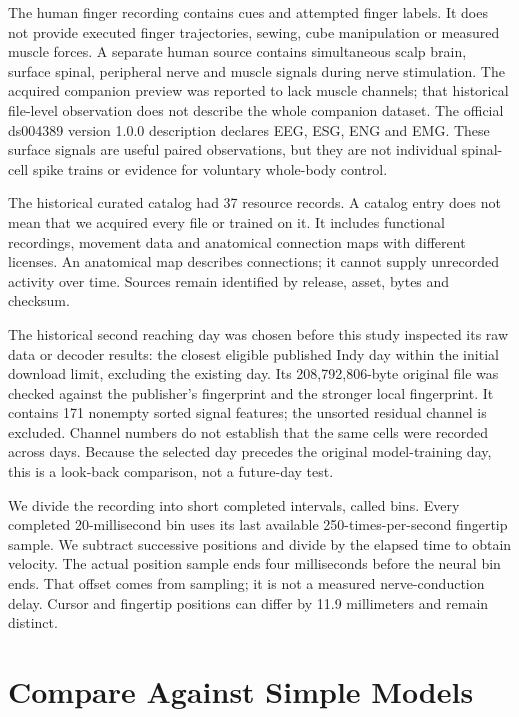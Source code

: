 The human finger recording contains cues and attempted finger labels. It does
not provide executed finger trajectories, sewing, cube manipulation or measured
muscle forces. A separate human source contains simultaneous scalp brain,
surface spinal, peripheral nerve and muscle signals during nerve stimulation.
The acquired companion preview was reported to lack muscle channels; that historical file-level observation does not describe the whole companion dataset. The official ds004389 version 1.0.0 description declares EEG, ESG, ENG and EMG. These surface signals are useful paired
observations, but they are not individual spinal-cell spike trains or evidence
for voluntary whole-body control.\citep{human_fingers2023,spinal_dataset2023,spinal_companion2023}

The historical curated catalog had 37 resource records. A catalog entry does not mean that
we acquired every file or trained on it. It includes functional recordings,
movement data and anatomical connection maps with different licenses. An
anatomical map describes connections; it cannot supply unrecorded activity over
time. Sources remain identified by release, asset, bytes and checksum.

The historical second reaching day was chosen before this study inspected its raw data or decoder results: the closest eligible published Indy day within the initial download limit, excluding the existing day. Its 208,792,806-byte original file was checked against the publisher's fingerprint and the stronger local fingerprint. It contains 171 nonempty sorted signal features; the unsorted residual channel is excluded. Channel numbers do not establish that the same cells were recorded across days. Because the selected day precedes the original model-training day, this is a look-back comparison, not a future-day test.

We divide the recording into short completed intervals, called bins.
Every completed 20-millisecond bin uses its last available 250-times-per-second
fingertip sample. We subtract successive positions and divide by the elapsed
time to obtain velocity. The actual
position sample ends four milliseconds before the neural bin ends. That offset
comes from sampling; it is not a measured nerve-conduction delay. Cursor and
fingertip positions can differ by 11.9 millimeters and remain distinct.

\section{Compare Against Simple Models}

